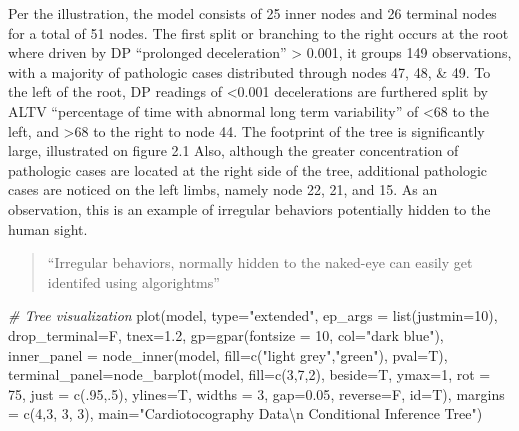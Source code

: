 \documentclass[
]{article}
\newenvironment{Shaded}{\begin{snugshade}}{\end{snugshade}}
\newcommand{\AttributeTok}[1]{\textcolor[rgb]{0.77,0.63,0.00}{#1}}
\newcommand{\CommentTok}[1]{\textcolor[rgb]{0.56,0.35,0.01}{\textit{#1}}}
\newcommand{\DecValTok}[1]{\textcolor[rgb]{0.00,0.00,0.81}{#1}}
\newcommand{\FloatTok}[1]{\textcolor[rgb]{0.00,0.00,0.81}{#1}}
\newcommand{\FunctionTok}[1]{\textcolor[rgb]{0.00,0.00,0.00}{#1}}
\newcommand{\NormalTok}[1]{#1}
\newcommand{\SpecialCharTok}[1]{\textcolor[rgb]{0.00,0.00,0.00}{#1}}
\newcommand{\StringTok}[1]{\textcolor[rgb]{0.31,0.60,0.02}{#1}}
\begin{document}
Per the illustration, the model consists of 25 inner nodes and 26
terminal nodes for a total of 51 nodes. The first split or branching to
the right occurs at the root where driven by DP ``prolonged
deceleration'' \textgreater{} 0.001, it groups 149 observations, with a
majority of pathologic cases distributed through nodes 47, 48, \& 49. To
the left of the root, DP readings of \textless0.001 decelerations are
furthered split by ALTV ``percentage of time with abnormal long term
variability'' of \textless68 to the left, and \textgreater68 to the
right to node 44. The footprint of the tree is significantly large,
illustrated on figure 2.1 Also, although the greater concentration of
pathologic cases are located at the right side of the tree, additional
pathologic cases are noticed on the left limbs, namely node 22, 21, and
15. As an observation, this is an example of irregular behaviors
potentially hidden to the human sight.

\begin{quote}
``Irregular behaviors, normally hidden to the naked-eye can easily get
identifed using algorightms''
\end{quote}

\begin{Shaded}
\begin{Highlighting}[]
\CommentTok{\# Tree visualization}
\FunctionTok{plot}\NormalTok{(model, }\AttributeTok{type=}\StringTok{"extended"}\NormalTok{, }\AttributeTok{ep\_args =} \FunctionTok{list}\NormalTok{(}\AttributeTok{justmin=}\DecValTok{10}\NormalTok{), }\AttributeTok{drop\_terminal=}\NormalTok{F, }\AttributeTok{tnex=}\FloatTok{1.2}\NormalTok{, }
     \AttributeTok{gp=}\FunctionTok{gpar}\NormalTok{(}\AttributeTok{fontsize =} \DecValTok{10}\NormalTok{, }\AttributeTok{col=}\StringTok{"dark blue"}\NormalTok{),}
     \AttributeTok{inner\_panel =} \FunctionTok{node\_inner}\NormalTok{(model, }\AttributeTok{fill=}\FunctionTok{c}\NormalTok{(}\StringTok{"light grey"}\NormalTok{,}\StringTok{"green"}\NormalTok{), }\AttributeTok{pval=}\NormalTok{T), }
     \AttributeTok{terminal\_panel=}\FunctionTok{node\_barplot}\NormalTok{(model, }\AttributeTok{fill=}\FunctionTok{c}\NormalTok{(}\DecValTok{3}\NormalTok{,}\DecValTok{7}\NormalTok{,}\DecValTok{2}\NormalTok{), }\AttributeTok{beside=}\NormalTok{T, }\AttributeTok{ymax=}\DecValTok{1}\NormalTok{, }\AttributeTok{rot =} \DecValTok{75}\NormalTok{, }
     \AttributeTok{just =} \FunctionTok{c}\NormalTok{(.}\DecValTok{95}\NormalTok{,.}\DecValTok{5}\NormalTok{), }\AttributeTok{ylines=}\NormalTok{T, }\AttributeTok{widths =} \DecValTok{3}\NormalTok{, }\AttributeTok{gap=}\FloatTok{0.05}\NormalTok{, }\AttributeTok{reverse=}\NormalTok{F, }\AttributeTok{id=}\NormalTok{T), }
     \AttributeTok{margins =} \FunctionTok{c}\NormalTok{(}\DecValTok{4}\NormalTok{,}\DecValTok{3}\NormalTok{, }\DecValTok{3}\NormalTok{, }\DecValTok{3}\NormalTok{), }
     \AttributeTok{main=}\StringTok{"Cardiotocography Data}\SpecialCharTok{\textbackslash{}n}\StringTok{ Conditional Inference Tree"}\NormalTok{)}
\end{Highlighting}
\end{Shaded}
\end{document}
